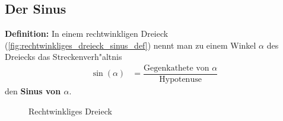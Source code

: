 \documentclass{standalone}
\begin{document}
\subsection{Der Sinus}

\textbf{Definition:} In einem rechtwinkligen Dreieck (\autoref{fig:rechtwinkliges_dreieck_sinus_def}) nennt man zu einem Winkel $\alpha$ des Dreiecks das Streckenverh{"a}ltnis
\begin{align}
  \sin(\alpha) & = \dfrac{\text{Gegenkathete von $\alpha$}}{\text{Hypotenuse}} \nonumber
\end{align}
den \textbf{Sinus von $\alpha$}.
\begin{figure}[hb!]
  \centering
  \def\svgwidth{200px}
  
  \caption{Rechtwinkliges Dreieck}
  \label{fig:rechtwinkliges_dreieck_sinus_def}
\end{figure}
\end{document}
